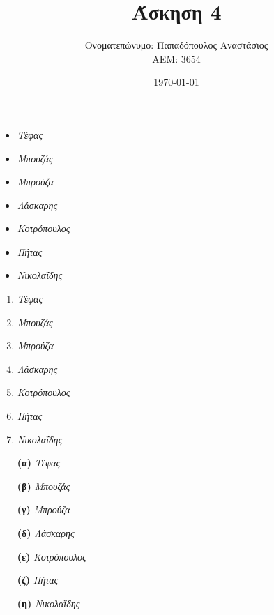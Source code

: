 \documentclass{article}
\title{Άσκηση 4}
\author{Ονοματεπώνυμο: Παπαδόπουλος Αναστάσιος \\ 
        ΑΕΜ: 3654}
\date{\today}
\begin{document}
    \maketitle
    \begin{itemize}
        \item \emph{Τέφας}
        \item \emph{Μπουζάς}
        \item \emph{Μπρούζα}
        \item \emph{Λάσκαρης}
        \item \emph{Κοτρόπουλος}
        \item \emph{Πήτας}
        \item \emph{Νικολαΐδης} 
    \end{itemize}
    \begin{enumerate}
        \item \emph{Τέφας}
        \item \emph{Μπουζάς}
        \item \emph{Μπρούζα}
        \item \emph{Λάσκαρης}
        \item \emph{Κοτρόπουλος}
        \item \emph{Πήτας}
        \item \emph{Νικολαΐδης}
    \end{enumerate}
    \begin{enumerate}
        \item [\textbf{(α)}] \emph{Τέφας}
        \item [\textbf{(β)}] \emph{Μπουζάς}
        \item [\textbf{(γ)}] \emph{Μπρούζα}
        \item [\textbf{(δ)}] \emph{Λάσκαρης}
        \item [\textbf{(ε)}] \emph{Κοτρόπουλος}
        \item [\textbf{(ζ)}] \emph{Πήτας}
        \item [\textbf{(η)}] \emph{Νικολαΐδης}
    \end{enumerate}
\end{document}
